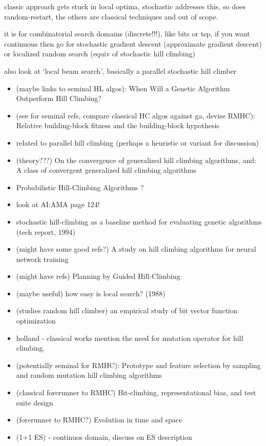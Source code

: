 \documentclass[a4paper, 11pt]{article}
\begin{document}
classic approach gets stuck in local optima, stochastic addresses this, so does random-restart, the others are classical techniques and out of scope.

it is for combinatorial search domains (discrete!!!), like bits or tsp, if you want continuous then go for stochastic gradient descent (approximate gradient descent) or localized random search (equiv of stochastic hill climbing)

also look at `local beam search', basically a parallel stochastic hill climber

\begin{itemize}
	\item (maybe links to seminal HL algos): When Will a Genetic Algorithm Outperform Hill Climbing?
	\item (see for seminal refs, compare classical HC algos against ga, devise RMHC): Relative building-block fitness and the building-block hypothesis
	\item related to parallel hill climbing (perhaps a heuristic or variant for discussion)
	\item (theory???) On the convergence of generalized hill climbing algorithms, and: A class of convergent generalized hill climbing algorithms
	\item Probabilistic Hill-Climbing Algorithms ?
	\item look at AI:AMA page 124!
	\item stochastic hill-climbing as a baseline method for evaluating genetic algorithms (tech report, 1994)
	\item (might have some good refs?) A study on hill climbing algorithms for neural network training
	\item (might have refs) Planning by Guided Hill-Climbing
	\item (maybe useful) how easy is local search? (1988)
	\item (studies random hill climber) an empirical study of bit vector function optimization 
	\item holland - classical works mention the need for mutation operator for hill climbing.
	\item (potentially seminal for RMHC): Prototype and feature selection by sampling and random mutation hill climbing algorithms
	\item (classical forerunner to RMHC) Bit-climbing, representational bias, and test suite design 
	\item (forerunner to RMHC?) Evolution in time and space
	\item (1+1 ES) - continuos domain, discuss on ES description
\end{itemize}
\end{document}
